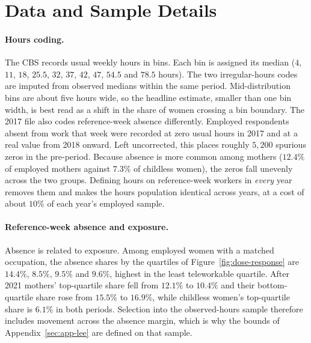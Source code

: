 
\section{Data and Sample Details}\label{sec:app-data}

\paragraph{Hours coding.}
The CBS records usual weekly hours in bins. Each bin is assigned its median ($4$, $11$, $18$,
$25.5$, $32$, $37$, $42$, $47$, $54.5$ and $78.5$ hours). The two irregular-hours codes are
imputed from observed medians within the same period. Mid-distribution bins are about five hours
wide, so the headline estimate, smaller than one bin width, is best read as a shift in the share
of women crossing a bin boundary. The 2017 file also codes reference-week absence differently.
Employed respondents absent from work that week were recorded at zero usual hours in 2017 and at
a real value from 2018 onward. Left uncorrected, this places roughly $5{,}200$ spurious zeros in
the pre-period. Because absence is more common among mothers ($12.4\%$ of employed mothers
against $7.3\%$ of childless women), the zeros fall unevenly across the two groups. Defining
hours on reference-week workers in \emph{every} year removes them and makes the hours population
identical across years, at a cost of about $10\%$ of each year's employed sample.

\paragraph{Reference-week absence and exposure.}
Absence is related to exposure. Among employed women with a matched occupation, the absence
shares by the quartiles of Figure~\ref{fig:dose-response} are $14.4\%$, $8.5\%$, $9.5\%$ and
$9.6\%$, highest in the least teleworkable quartile. After 2021 mothers' top-quartile share fell
from $12.1\%$ to $10.4\%$ and their bottom-quartile share rose from $15.5\%$ to $16.9\%$, while
childless women's top-quartile share is $6.1\%$ in both periods. Selection into the
observed-hours sample therefore includes movement across the absence margin, which is why the
bounds of Appendix~\ref{sec:app-lee} are defined on that sample.

